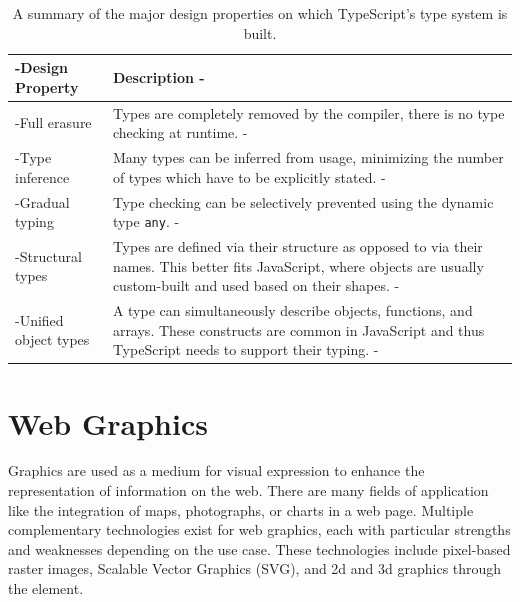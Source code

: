 \begin{table}[tp]
\tablestretch
{}
\centering
\begin{tabularx}{\linewidth}{>{\kern-\tabcolsep}lX<{\kern-\tabcolsep}}
\toprule
Design Property & Description \\
\midrule
Full erasure         &
Types are completely removed by the compiler, there is no type checking at runtime. \\
%
Type inference       &
Many types can be inferred from usage, minimizing the number of types which have to be explicitly stated. \\
%
Gradual typing       &
Type checking can be selectively prevented using the dynamic type \lstinline{any}. \\
%
Structural types     &
Types are defined via their structure as opposed to via their names.
This better fits JavaScript, where objects are usually custom-built and used based on their shapes. \\
%
Unified object types &
A type can simultaneously describe objects, functions, and arrays.
These constructs are common in JavaScript and thus TypeScript needs to support their typing. \\
\bottomrule
\end{tabularx}
\caption[TypeScript Type System Design Properties]{
A summary of the major design properties on which TypeScript's type system is built.
}
\label{tab:TSTypeSystemDesignProperties}
\end{table}









\section{Web Graphics}
\label{sec:WebGraphics}

Graphics are used as a medium for visual expression to enhance the
representation of information on the web. There are many fields of
application like the integration of maps, photographs, or charts in a
web page. Multiple complementary technologies exist for web graphics,
each with particular strengths and weaknesses depending on the use
case. These technologies include pixel-based raster images, Scalable
Vector Graphics (SVG), and 2d and 3d graphics through the
 element.



